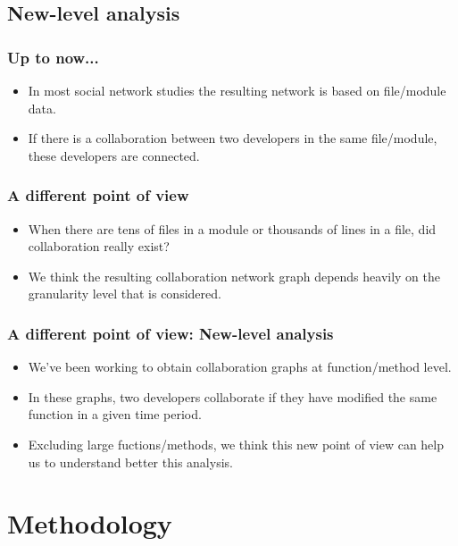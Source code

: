 \documentclass{beamer}
\begin{document}
\subsection{New-level analysis} %

\begin{frame}
\frametitle{Up to now...}
\begin{itemize}
\item In most social network studies the resulting network is based on file/module data.
\item If there is a collaboration between two developers in the same file/module, these developers are connected.
\end{itemize}
\end{frame}


\begin{frame}
\frametitle{A different point of view}
\begin{itemize}
\item When there are tens of files in a module or thousands of lines in a file, did collaboration really exist?
\item We think the resulting collaboration network graph depends heavily on the granularity level that is considered.
\end{itemize}
\end{frame}


\begin{frame}
\frametitle{A different point of view: New-level analysis}
\begin{itemize}
\item We've been working to obtain collaboration graphs at function/method level.
\item In these graphs, two developers collaborate if they have modified the same function in a given time period.
\item Excluding large fuctions/methods, we think this new point of view can help us to understand better this analysis.
\end{itemize}
\end{frame}

\section{Methodology}
\end{document}
